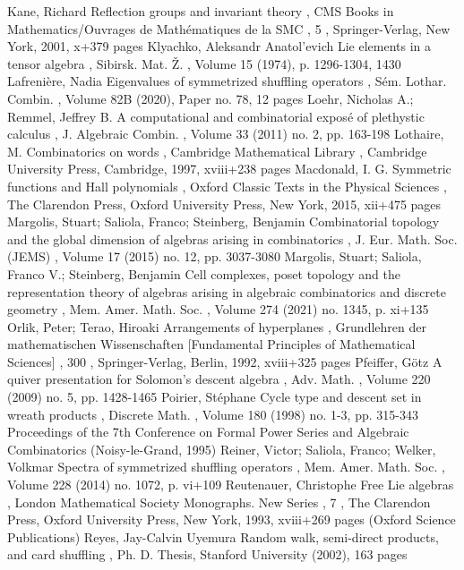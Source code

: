 Kane, Richard Reflection groups and invariant theory , CMS Books in Mathematics/Ouvrages de Mathématiques de la SMC , 5 , Springer-Verlag, New York, 2001, x+379 pages
 Klyachko, Aleksandr Anatol’evich Lie elements in a tensor algebra , Sibirsk. Mat. Ž. , Volume 15 (1974), p. 1296-1304, 1430
 Lafrenière, Nadia Eigenvalues of symmetrized shuffling operators , Sém. Lothar. Combin. , Volume 82B (2020), Paper no. 78, 12 pages
 Loehr, Nicholas A.; Remmel, Jeffrey B. A computational and combinatorial exposé of plethystic calculus , J. Algebraic Combin. , Volume 33 (2011) no. 2, pp. 163-198
 Lothaire, M. Combinatorics on words , Cambridge Mathematical Library , Cambridge University Press, Cambridge, 1997, xviii+238 pages
 Macdonald, I. G. Symmetric functions and Hall polynomials , Oxford Classic Texts in the Physical Sciences , The Clarendon Press, Oxford University Press, New York, 2015, xii+475 pages
 Margolis, Stuart; Saliola, Franco; Steinberg, Benjamin Combinatorial topology and the global dimension of algebras arising in combinatorics , J. Eur. Math. Soc. (JEMS) , Volume 17 (2015) no. 12, pp. 3037-3080
 Margolis, Stuart; Saliola, Franco V.; Steinberg, Benjamin Cell complexes, poset topology and the representation theory of algebras arising in algebraic combinatorics and discrete geometry , Mem. Amer. Math. Soc. , Volume 274 (2021) no. 1345, p. xi+135
 Orlik, Peter; Terao, Hiroaki Arrangements of hyperplanes , Grundlehren der mathematischen Wissenschaften [Fundamental Principles of Mathematical Sciences] , 300 , Springer-Verlag, Berlin, 1992, xviii+325 pages
 Pfeiffer, Götz A quiver presentation for Solomon’s descent algebra , Adv. Math. , Volume 220 (2009) no. 5, pp. 1428-1465
 Poirier, Stéphane Cycle type and descent set in wreath products , Discrete Math. , Volume 180 (1998) no. 1-3, pp. 315-343 Proceedings of the 7th Conference on Formal Power Series and Algebraic Combinatorics (Noisy-le-Grand, 1995)
 Reiner, Victor; Saliola, Franco; Welker, Volkmar Spectra of symmetrized shuffling operators , Mem. Amer. Math. Soc. , Volume 228 (2014) no. 1072, p. vi+109
 Reutenauer, Christophe Free Lie algebras , London Mathematical Society Monographs. New Series , 7 , The Clarendon Press, Oxford University Press, New York, 1993, xviii+269 pages (Oxford Science Publications)
 Reyes, Jay-Calvin Uyemura Random walk, semi-direct products, and card shuffling , Ph. D. Thesis, Stanford University (2002), 163 pages
